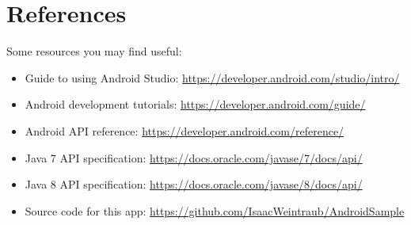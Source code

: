 \documentclass{article}
\begin{document}
\section{References}
Some resources you may find useful:
\begin{itemize}
\item Guide to using Android Studio: \url{https://developer.android.com/studio/intro/} 
\item Android development tutorials: \url{https://developer.android.com/guide/} 
\item Android API reference: \url{https://developer.android.com/reference/}
\item Java 7 API specification: \url{https://docs.oracle.com/javase/7/docs/api/} 
\item Java 8 API specification: \url{https://docs.oracle.com/javase/8/docs/api/}
\item Source code for this app: \url{https://github.com/IsaacWeintraub/AndroidSample} 
\end{itemize}
\end{document}
